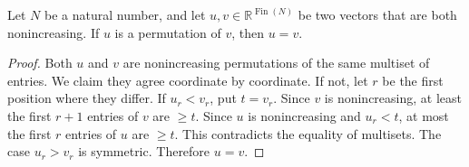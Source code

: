 \begin{helper}
Let \(N\) be a natural number, and let \(u, v \in \mathbb{R}^{\operatorname{Fin}(N)}\) be two vectors that are both nonincreasing. If \(u\) is a permutation of \(v\), then \(u = v\).
\end{helper}
\begin{proof}
Both \(u\) and \(v\) are nonincreasing permutations of the same multiset of entries. We claim they agree coordinate by coordinate. If not, let \(r\) be the first position where they differ.
If \(u_r < v_r\), put \(t = v_r\). Since \(v\) is nonincreasing, at least the first \(r+1\) entries of \(v\) are \(\ge t\). Since \(u\) is nonincreasing and \(u_r < t\), at most the first \(r\) entries of \(u\) are \(\ge t\). This contradicts the equality of multisets.
The case \(u_r > v_r\) is symmetric. Therefore \(u = v\).
\end{proof}
